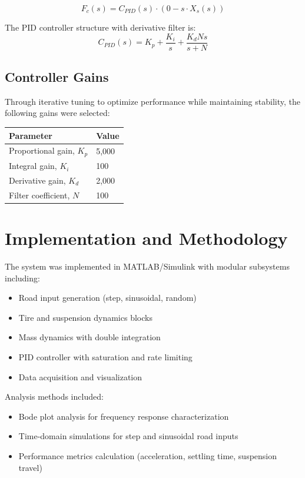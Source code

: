 \documentclass[12pt,a4paper]{article}
\begin{document}
\begin{equation}
    F_c(s) = C_{PID}(s) \cdot \left( 0 - s \cdot X_s(s) \right)
\end{equation}

The PID controller structure with derivative filter is:
\begin{equation}
    C_{PID}(s) = K_p + \frac{K_i}{s} + \frac{K_d N s}{s + N}
\end{equation}

\subsection{Controller Gains}
Through iterative tuning to optimize performance while maintaining stability, the following gains were selected:

\begin{table}[H]
\centering
\begin{tabular}{@{}ll@{}}
\toprule
\textbf{Parameter} & \textbf{Value} \\ \midrule
Proportional gain, $K_p$ & 5,000 \\
Integral gain, $K_i$ & 100 \\
Derivative gain, $K_d$ & 2,000 \\
Filter coefficient, $N$ & 100 \\ \bottomrule
\end{tabular}
\end{table}

\section{Implementation and Methodology}

The system was implemented in MATLAB/Simulink with modular subsystems including:
\begin{itemize}
    \item Road input generation (step, sinusoidal, random)
    \item Tire and suspension dynamics blocks
    \item Mass dynamics with double integration
    \item PID controller with saturation and rate limiting
    \item Data acquisition and visualization
\end{itemize}

Analysis methods included:
\begin{itemize}
    \item Bode plot analysis for frequency response characterization
    \item Time-domain simulations for step and sinusoidal road inputs
    \item Performance metrics calculation (acceleration, settling time, suspension travel)
\end{itemize}
\end{document}
